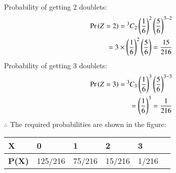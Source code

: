 \documentclass[journal,12pt,twocolumn]{IEEEtran}
\begin{document}
  Probability of getting 2 doublets:
 \begin{equation}
     \begin{split}
         \pr{Z=2} = \Mycomb[3]{2} \left(\frac{1}{6}\right)^2 \left(\frac{5}{6}\right)^{3-2}\\
         = 3 \times \left(\frac{1}{6}\right)^2\left(\frac{5}{6}\right)
         = \frac{15}{216}
     \end{split}
 \end{equation}
  Probability of getting 3 doublets:
  \begin{equation}
     \begin{split}
         \pr{Z=3} = \Mycomb[3]{3} \left(\frac{1}{6}\right)^3 \left(\frac{5}{6}\right)^{3-3}\\
         = \left(\frac{1}{6}\right)^3
         = \frac{1}{216}
     \end{split}
 \end{equation}
$\therefore$ The required probabilities are shown in the figure:
\begin{table}[ht]
\begin{tabular}{|l|l|l|l|l|l|}
\hline
\textbf{X}    & 0   & 1   & 2   & 3    \\ \hline
\textbf{P(X)} & 125/216 & 75/216 & 15/216 & 1/216  \\ \hline
\end{tabular}
\end{table}
\end{document}
